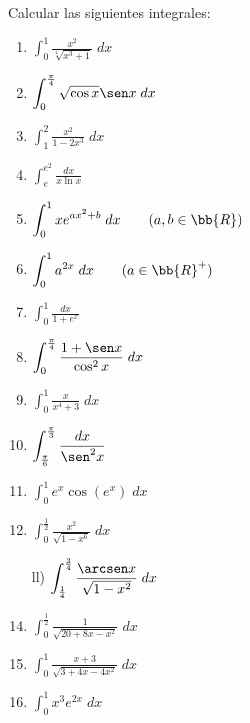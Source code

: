 \begin{ejercicio}
    Calcular las siguientes integrales:
    \begin{enumerate}
        \item $\displaystyle \int_0^1 \frac{x^2}{\sqrt[4]{x^3+1}}\;dx$

        \item $\displaystyle \int_0^\frac{\pi}{4} \sqrt{\cos x}\sen x\;dx$

        \item $\displaystyle \int_1^2 \frac{x^2}{1-2x^3}\;dx$

        \item $\displaystyle \int_e^{e^2} \frac{dx}{x\ln x}$

        \item $\displaystyle \int_0^1 xe^{ax^2+b}\;dx \qquad (a,b\in \bb{R})$

        \item $\displaystyle \int_0^1 a^{2x}\;dx \qquad (a\in \bb{R}^+)$

        \item $\displaystyle \int_0^1 \frac{dx}{1+e^x}$

        \item $\displaystyle \int_0^{\frac{\pi}{4}} \frac{1+\sen x}{\cos^2 x}\;dx$

        \item $\displaystyle \int_0^1 \frac{x}{x^4+3}\;dx$

        \item $\displaystyle \int_{\frac{\pi}{6}}^{\frac{\pi}{3}} \frac{dx}{\sen^2 x}$

        \item $\displaystyle \int_0^1 e^x \cos(e^x)\;dx$

        \item $\displaystyle \int_0^{\frac{1}{2}} \frac{x^2}{\sqrt{1-x^6}}\;dx$

        \item[ll)] $\displaystyle \int_{\frac{1}{4}}^{\frac{3}{4}} \frac{\arcsen x}{\sqrt{1-x^2}}\;dx$

        \item $\displaystyle \int_0^{\frac{1}{2}} \frac{1}{\sqrt{20+8x-x^2}}\;dx$

        \item $\displaystyle \int_0^1 \frac{x+3}{\sqrt{3+4x-4x^2}}\;dx$

        \item $\displaystyle \int_0^1 x^3 e^{2x}\;dx$


\end{enumerate}
\end{ejercicio}
